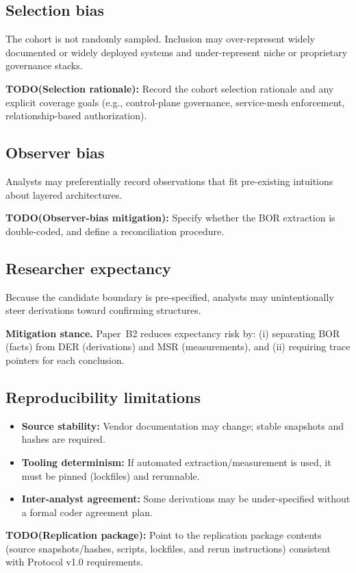 \subsection{Selection bias}
The cohort is not randomly sampled. Inclusion may over-represent widely documented or widely deployed systems and under-represent niche or proprietary governance stacks.

\textbf{TODO(Selection rationale):} Record the cohort selection rationale and any explicit coverage goals (e.g., control-plane governance, service-mesh enforcement, relationship-based authorization).

\subsection{Observer bias}
Analysts may preferentially record observations that fit pre-existing intuitions about layered architectures.

\textbf{TODO(Observer-bias mitigation):} Specify whether the BOR extraction is double-coded, and define a reconciliation procedure.

\subsection{Researcher expectancy}
Because the candidate boundary is pre-specified, analysts may unintentionally steer derivations toward confirming structures.

\textbf{Mitigation stance.} Paper~B2 reduces expectancy risk by: (i) separating BOR (facts) from DER (derivations) and MSR (measurements), and (ii) requiring trace pointers for each conclusion.

\subsection{Reproducibility limitations}
\begin{itemize}
  \item \textbf{Source stability:} Vendor documentation may change; stable snapshots and hashes are required.
  \item \textbf{Tooling determinism:} If automated extraction/measurement is used, it must be pinned (lockfiles) and rerunnable.
  \item \textbf{Inter-analyst agreement:} Some derivations may be under-specified without a formal coder agreement plan.
\end{itemize}

\textbf{TODO(Replication package):} Point to the replication package contents (source snapshots/hashes, scripts, lockfiles, and rerun instructions) consistent with Protocol v1.0 requirements.
